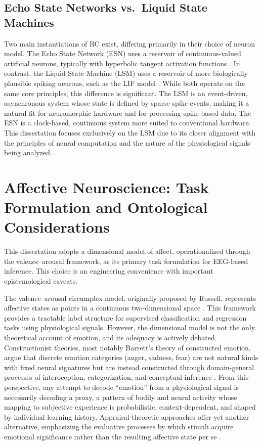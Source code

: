 \subsection{Echo State Networks vs.\ Liquid State Machines}
Two main instantiations of RC exist, differing primarily in their choice of neuron model. The Echo State Network (ESN) uses a reservoir of continuous-valued artificial neurons, typically with hyperbolic tangent activation functions \cite{jaeger2001echo}. In contrast, the Liquid State Machine (LSM) uses a reservoir of more biologically plausible spiking neurons, such as the LIF model \cite{Maass2002RealTime}. While both operate on the same core principles, this difference is significant. The LSM is an event-driven, asynchronous system whose state is defined by sparse spike events, making it a natural fit for neuromorphic hardware and for processing spike-based data. The ESN is a clock-based, continuous system more suited to conventional hardware. This dissertation focuses exclusively on the LSM due to its closer alignment with the principles of neural computation and the nature of the physiological signals being analyzed.


\section{Affective Neuroscience: Task Formulation and Ontological Considerations}
\label{sec:affect_ontology}

This dissertation adopts a dimensional model of affect, operationalized through the valence--arousal framework, as its primary task formulation for EEG-based inference. This choice is an engineering convenience with important epistemological caveats.

The valence--arousal circumplex model, originally proposed by Russell, represents affective states as points in a continuous two-dimensional space \cite{russell_1980}. This framework provides a tractable label structure for supervised classification and regression tasks using physiological signals. However, the dimensional model is not the only theoretical account of emotion, and its adequacy is actively debated. Constructionist theories, most notably Barrett's theory of constructed emotion, argue that discrete emotion categories (anger, sadness, fear) are not natural kinds with fixed neural signatures but are instead constructed through domain-general processes of interoception, categorization, and conceptual inference \cite{barrett_2017}. From this perspective, any attempt to decode ``emotion'' from a physiological signal is necessarily decoding a proxy, a pattern of bodily and neural activity whose mapping to subjective experience is probabilistic, context-dependent, and shaped by individual learning history. Appraisal-theoretic approaches offer yet another alternative, emphasizing the evaluative processes by which stimuli acquire emotional significance rather than the resulting affective state per se \cite{scherer_2009}.

